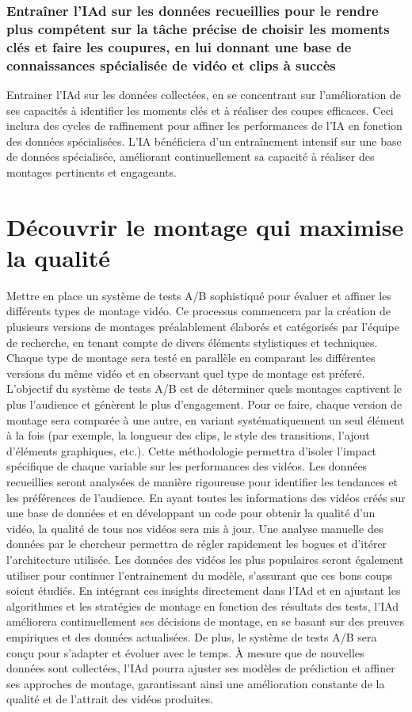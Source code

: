 \documentclass[livre]{udes-genie-these}
\begin{document}
{{\subsubsection{Entraîner l'IAd sur les données recueillies pour le rendre plus compétent sur la tâche précise de choisir les moments clés et faire les coupures, en lui donnant une base de connaissances spécialisée de vidéo et clips à succès}
Entrainer l'IAd sur les données collectées, en se concentrant sur l'amélioration de ses capacités à identifier les moments clés et à réaliser des coupes efficaces. Ceci inclura des cycles de raffinement pour affiner les performances de l'IA en fonction des données spécialisées. L'IA bénéficiera d'un entraînement intensif sur une base de données spécialisée, améliorant continuellement sa capacité à réaliser des montages pertinents et engageants.

\section{Découvrir le montage qui maximise la qualité}
Mettre en place un système de tests A/B sophistiqué pour évaluer et affiner les différents types de montage vidéo. Ce processus commencera par la création de plusieurs versions de montages préalablement élaborés et catégorisés par l'équipe de recherche, en tenant compte de divers éléments stylistiques et techniques. Chaque type de montage sera testé en parallèle en comparant les différentes versions du même vidéo et en observant quel type de montage est préferé.
L'objectif du système de tests A/B est de déterminer quels montages captivent le plus l'audience et génèrent le plus d'engagement. Pour ce faire, chaque version de montage sera comparée à une autre, en variant systématiquement un seul élément à la fois (par exemple, la longueur des clips, le style des transitions, l'ajout d'éléments graphiques, etc.). Cette méthodologie permettra d'isoler l'impact spécifique de chaque variable sur les performances des vidéos.
Les données recueillies seront analysées de manière rigoureuse pour identifier les tendances et les préférences de l'audience. En ayant toutes les informations des vidéos créés sur une base de données et en développant un code pour obtenir la qualité d'un vidéo, la qualité de tous nos vidéos sera mis à jour. Une analyse manuelle des données par le chercheur permettra de régler rapidement les bogues et d'itérer l'architecture utilisée. Les données des vidéos les plus populaires seront également utiliser pour continuer l'entrainement du modèle, s'assurant que ces bons coups soient étudiés.
En intégrant ces insights directement dans l'IAd et en ajustant les algorithmes et les stratégies de montage en fonction des résultats des tests, l'IAd améliorera continuellement ses décisions de montage, en se basant sur des preuves empiriques et des données actualisées.
De plus, le système de tests A/B sera conçu pour s'adapter et évoluer avec le temps. À mesure que de nouvelles données sont collectées, l'IAd pourra ajuster ses modèles de prédiction et affiner ses approches de montage, garantissant ainsi une amélioration constante de la qualité et de l'attrait des vidéos produites. 

}}
\end{document}
